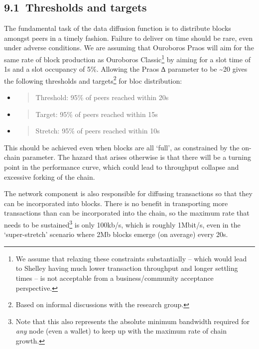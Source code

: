 \documentclass[11pt,a4paper]{article}
\begin{document}
\hypertarget{thresholds-and-targets}{%
\subsection{​9.1​~Thresholds and targets}\label{thresholds-and-targets}}

The fundamental task of the data diffusion function is to distribute
blocks amongst peers in a timely fashion. Failure to deliver on time
should be rare, even under adverse conditions. We are assuming that
Ouroboros Praos will aim for the same rate of block production as
Ouroboros Classic\footnote{We assume that relaxing these constraints
  substantially -- which would lead to Shelley having much lower
  transaction throughput and longer settling times -- is not acceptable
  from a business/community acceptance perspective.} by aiming for a
slot time of 1s and a slot occupancy of 5\%. Allowing the Praos ∆
parameter to be \textasciitilde{}20 gives the following thresholds and
targets\footnote{Based on informal discussions with the research group.}
for bloc distribution:


\begin{itemize}
\item
  \begin{quote}
  Threshold: 95\% of peers reached within 20s
  \end{quote}
\item
  \begin{quote}
  Target: 95\% of peers reached within 15s
  \end{quote}
\item
  \begin{quote}
  Stretch: 95\% of peers reached within 10s
  \end{quote}
\end{itemize}

This should be achieved even when blocks are all `full', as constrained
by the on-chain parameter. The hazard that arises otherwise is that
there will be a turning point in the performance curve, which could lead
to throughput collapse and excessive forking of the chain.

The network component is also responsible for diffusing transactions so
that they can be incorporated into blocks. There is no benefit in
transporting more transactions than can be incorporated into the chain,
so the maximum rate that needs to be sustained\footnote{Note that this
  also represents the absolute minimum bandwidth required for \emph{any}
  node (even a wallet) to keep up with the maximum rate of chain growth.}
is only 100kb/s, which is roughly 1Mbit/s, even in the `super-stretch'
scenario where 2Mb blocks emerge (on average) every 20s.
\end{document}
